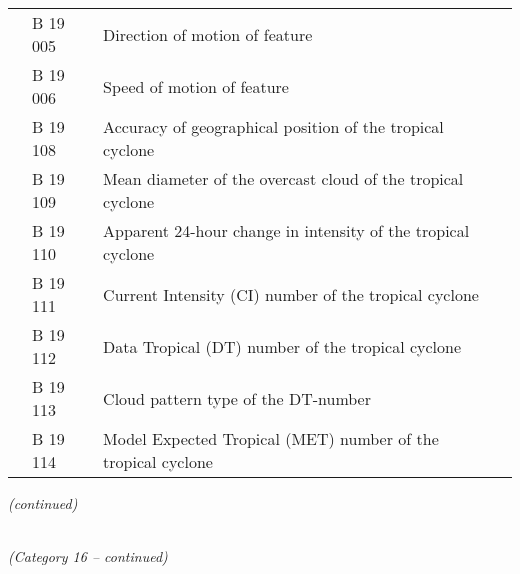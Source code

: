 \begin{longtable}[]{@{}llll@{}}
& B 19 005 & Direction of motion of feature &\tabularnewline
& B 19 006 & Speed of motion of feature &\tabularnewline
& B 19 108 & Accuracy of geographical position of the tropical cyclone &\tabularnewline
& B 19 109 & Mean diameter of the overcast cloud of the tropical cyclone &\tabularnewline
& B 19 110 & Apparent 24-hour change in intensity of the tropical cyclone &\tabularnewline
& B 19 111 & Current Intensity (CI) number of the tropical cyclone &\tabularnewline
& B 19 112 & Data Tropical (DT) number of the tropical cyclone &\tabularnewline
& B 19 113 & Cloud pattern type of the DT-number &\tabularnewline
& B 19 114 & Model Expected Tropical (MET) number of the tropical cyclone &\tabularnewline
\bottomrule
\end{longtable}

\emph{(continued)}

\emph{\\
(Category 16 -- continued)}

